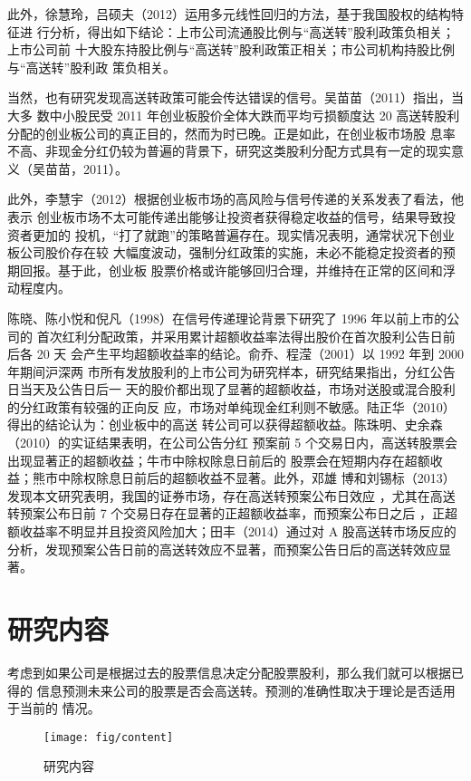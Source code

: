\documentclass[../main]{subfiles}
\begin{document}
此外，徐慧玲，吕硕夫（2012）运用多元线性回归的方法，基于我国股权的结构特征进
行分析，得出如下结论：上市公司流通股比例与“高送转”股利政策负相关；上市公司前
十大股东持股比例与“高送转”股利政策正相关；市公司机构持股比例与“高送转”股利政
策负相关。

当然，也有研究发现高送转政策可能会传达错误的信号。吴苗苗（2011）指出，当大多
数中小股民受 2011 年创业板股价全体大跌而平均亏损额度达 20%
高送转股利分配的创业板公司的真正目的，然而为时已晚。正是如此，在创业板市场股
息率不高、非现金分红仍较为普遍的背景下，研究这类股利分配方式具有一定的现实意
义（吴苗苗，2011）。

此外，李慧宇（2012）根据创业板市场的高风险与信号传递的关系发表了看法，他表示
创业板市场不太可能传递出能够让投资者获得稳定收益的信号，结果导致投资者更加的
投机，“打了就跑”的策略普遍存在。现实情况表明，通常状况下创业板公司股价存在较
大幅度波动，强制分红政策的实施，未必不能稳定投资者的预期回报。基于此，创业板
股票价格或许能够回归合理，并维持在正常的区间和浮动程度内。

陈晓、陈小悦和倪凡（1998）在信号传递理论背景下研究了 1996 年以前上市的公司的
首次红利分配政策，并采用累计超额收益率法得出股价在首次股利公告日前后各 20 天
会产生平均超额收益率的结论。俞乔、程滢（2001）以 1992 年到 2000 年期间沪深两
市所有发放股利的上市公司为研究样本，研究结果指出，分红公告日当天及公告日后一
天的股价都出现了显著的超额收益，市场对送股或混合股利的分红政策有较强的正向反
应，市场对单纯现金红利则不敏感。陆正华（2010）得出的结论认为：创业板中的高送
转公司可以获得超额收益。陈珠明、史余森（2010）的实证结果表明，在公司公告分红
预案前 5 个交易日内，高送转股票会出现显著正的超额收益；牛市中除权除息日前后的
股票会在短期内存在超额收益；熊市中除权除息日前后的超额收益不显著。此外，邓雄
博和刘锡标（2013）发现本文研究表明，我国的证券市场，存在高送转预案公布日效应
，尤其在高送转预案公布日前 7 个交易日存在显著的正超额收益率，而预案公布日之后
，正超额收益率不明显并且投资风险加大；田丰（2014）通过对 A 股高送转市场反应的
分析，发现预案公告日前的高送转效应不显著，而预案公告日后的高送转效应显著。

\section{研究内容}%
\label{sec:content}

考虑到如果公司是根据过去的股票信息决定分配股票股利，那么我们就可以根据已得的
信息预测未来公司的股票是否会高送转。预测的准确性取决于理论是否适用于当前的
情况。

\begin{figure}[htbp]
  \centering
  \texttt{[image: fig/content]}
  \caption{研究内容}%
  \label{fig:content}
\end{figure}
\end{document}
